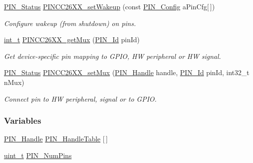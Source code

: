 \begin{DoxyCompactItemize}
\hyperlink{_p_i_n_8h_abe0ad59bbf09e51fe37195a5e70b23f6}{P\+I\+N\+\_\+\+Status} \hyperlink{_p_i_n_c_c26_x_x_8h_a7eea7460f3e2d4c68df55239471805aa}{P\+I\+N\+C\+C26\+X\+X\+\_\+set\+Wakeup} (const \hyperlink{_p_i_n_8h_ae427b7d2925f9b0f3145e455cfdb5841}{P\+I\+N\+\_\+\+Config} a\+Pin\+Cfg\mbox{[}$\,$\mbox{]})
\begin{DoxyCompactList}\small\item\em Configure wakeup (from shutdown) on pins. \end{DoxyCompactList}\item 
\hyperlink{_p_i_n_8h_ab6fd6105e64ed14a0c9281326f05e623}{int\+\_\+t} \hyperlink{_p_i_n_c_c26_x_x_8h_a568b24bc5bf40ce5f525be32a67c969a}{P\+I\+N\+C\+C26\+X\+X\+\_\+get\+Mux} (\hyperlink{_p_i_n_8h_a9ae8197f460bb76ea09a84f47d09921f}{P\+I\+N\+\_\+\+Id} pin\+Id)
\begin{DoxyCompactList}\small\item\em Get device-\/specific pin mapping to G\+P\+I\+O, H\+W peripheral or H\+W signal. \end{DoxyCompactList}\item 
\hyperlink{_p_i_n_8h_abe0ad59bbf09e51fe37195a5e70b23f6}{P\+I\+N\+\_\+\+Status} \hyperlink{_p_i_n_c_c26_x_x_8h_ac8cbb649db80dd03d8e8a487aef43294}{P\+I\+N\+C\+C26\+X\+X\+\_\+set\+Mux} (\hyperlink{_p_i_n_8h_afb2de52b054638f63c39df1f30a0d88d}{P\+I\+N\+\_\+\+Handle} handle, \hyperlink{_p_i_n_8h_a9ae8197f460bb76ea09a84f47d09921f}{P\+I\+N\+\_\+\+Id} pin\+Id, int32\+\_\+t n\+Mux)
\begin{DoxyCompactList}\small\item\em Connect pin to H\+W peripheral, signal or to G\+P\+I\+O. \end{DoxyCompactList}\end{DoxyCompactItemize}
\subsubsection*{Variables}
\begin{DoxyCompactItemize}
\item 
\hyperlink{_p_i_n_8h_afb2de52b054638f63c39df1f30a0d88d}{P\+I\+N\+\_\+\+Handle} \hyperlink{_p_i_n_c_c26_x_x_8h_a29e70a78c6a3f320797dc1db539988ac}{P\+I\+N\+\_\+\+Handle\+Table} \mbox{[}$\,$\mbox{]}
\item 
\hyperlink{_p_i_n_8h_a12a1e9b3ce141648783a82445d02b58d}{uint\+\_\+t} \hyperlink{_p_i_n_c_c26_x_x_8h_a138463d5bac2d11077c400c268491136}{P\+I\+N\+\_\+\+Num\+Pins}
\end{DoxyCompactItemize}



